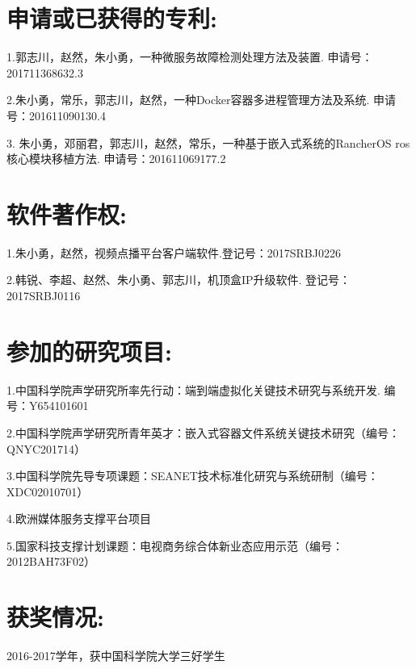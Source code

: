 

\section*{申请或已获得的专利:}

1.郭志川，赵然，朱小勇，一种微服务故障检测处理方法及装置. 申请号：201711368632.3

2.朱小勇，常乐，郭志川，赵然，一种Docker容器多进程管理方法及系统. 申请号：201611090130.4

3. 朱小勇，邓丽君，郭志川，赵然，常乐，一种基于嵌入式系统的RancherOS ros核心模块移植方法. 申请号：201611069177.2

\section*{软件著作权:}

1.朱小勇，赵然，视频点播平台客户端软件.登记号：2017SRBJ0226

2.韩锐、李超、赵然、朱小勇、郭志川，机顶盒IP升级软件. 登记号：2017SRBJ0116

\section*{参加的研究项目:}

1.中国科学院声学研究所率先行动：端到端虚拟化关键技术研究与系统开发. 编号：Y654101601

2.中国科学院声学研究所青年英才：嵌入式容器文件系统关键技术研究（编号：QNYC201714）

3.中国科学院先导专项课题：SEANET技术标准化研究与系统研制（编号：XDC02010701）

4.欧洲媒体服务支撑平台项目

5.国家科技支撑计划课题：电视商务综合体新业态应用示范（编号：2012BAH73F02）

\section*{获奖情况:}
2016-2017学年，获中国科学院大学三好学生

\cleardoublepage[plain]%

